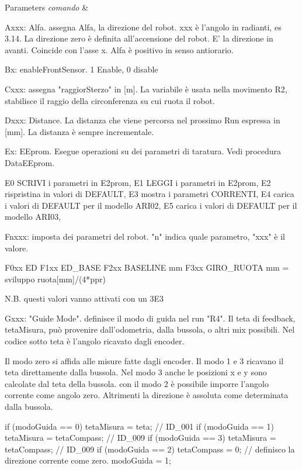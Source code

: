 \begin{DoxyParams}{Parameters}
{\em comando} & \begin{DoxyVerb}Axxx: Alfa. assegna Alfa, la direzione del robot. xxx è l'angolo in radianti, es 3.14. La direzione zero è definita all'accensione del robot. E' la direzione in avanti. Coincide con l'asse x.
        Alfa è positivo in senso antiorario.

Bx:     enableFrontSensor. 1 Enable, 0 disable

Cxxx: assegna "raggiorSterzo" in [m]. La variabile è usata nella movimento R2, stabilisce il raggio della circonferenza su cui ruota il robot.

Dxxx: Distance. La distanza che viene percorsa nel prossimo Run espressa in [mm]. La distanza è sempre incrementale. 

Ex: EEprom.  Esegue operazioni su dei parametri di taratura. Vedi procedura DataEEprom. 

    E0 SCRIVI i parametri in E2prom,            
    E1 LEGGI i parametri in E2prom,             
    E2 rispristina in valori di DEFAULT,            
    E3 mostra i parametri CORRENTI,             
    E4 carica i valori di DEFAULT per il modello ARI02,             
    E5 carica i valori di DEFAULT per il modello ARI03, 

Fnxxx: imposta dei parametri del robot. "n" indica quale parametro, "xxx" è il valore. 

    F0xx ED             
    F1xx ED_BASE            
    F2xx BASELINE       mm
    F3xx GIRO_RUOTA     mm  = sviluppo ruota[mm]/(4*ppr)

    N.B. questi valori vanno attivati con un 3E3

Gxxx:   "Guide Mode". definisce il modo di guida nel run "R4". Il teta di feedback, tetaMisura, può provenire dall'odometria, dalla bussola, o altri mix possibili.
        Nel codice sotto teta è l'angolo ricavato dagli encoder.

        Il modo zero si affida alle misure fatte dagli encoder.
        Il modo 1 e 3 ricavano il teta direttamente dalla bussola. Nel modo 3 anche le posizioni x e y 
        sono calcolate dal teta della bussola.
        con il modo 2 è possibile imporre l'angolo corrente come angolo zero. Altrimenti la direzione è
        assoluta come determinata dalla bussola.

        if (modoGuida == 0) tetaMisura = teta;          // ID_001               
        if (modoGuida == 1) tetaMisura = tetaCompass;   // ID_009               
        if (modoGuida == 3) tetaMisura = tetaCompass;   // ID_009               
        if (modoGuida == 2) {                   
            tetaCompass = 0;    // definisco la direzione corrente come zero.                   
            modoGuida   = 1;
            }


\end{DoxyVerb}
\end{DoxyParams}
